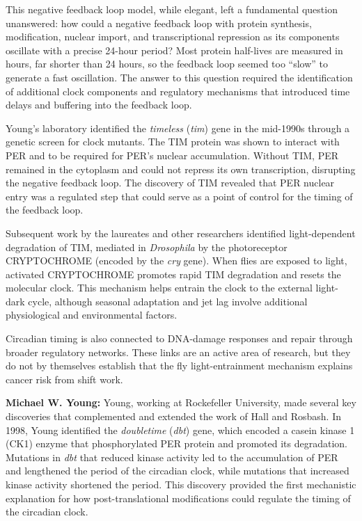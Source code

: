 This negative feedback loop model, while elegant, left a fundamental question unanswered: how could a negative feedback loop with protein synthesis, modification, nuclear import, and transcriptional repression as its components oscillate with a precise 24-hour period? Most protein half-lives are measured in hours, far shorter than 24 hours, so the feedback loop seemed too ``slow'' to generate a fast oscillation. The answer to this question required the identification of additional clock components and regulatory mechanisms that introduced time delays and buffering into the feedback loop.

Young's laboratory identified the \textit{timeless} (\textit{tim}) gene in the mid-1990s through a genetic screen for clock mutants. The TIM protein was shown to interact with PER and to be required for PER's nuclear accumulation. Without TIM, PER remained in the cytoplasm and could not repress its own transcription, disrupting the negative feedback loop. The discovery of TIM revealed that PER nuclear entry was a regulated step that could serve as a point of control for the timing of the feedback loop.

Subsequent work by the laureates and other researchers identified light-dependent degradation of TIM, mediated in \textit{Drosophila} by the photoreceptor CRYPTOCHROME (encoded by the \textit{cry} gene). When flies are exposed to light, activated CRYPTOCHROME promotes rapid TIM degradation and resets the molecular clock. This mechanism helps entrain the clock to the external light-dark cycle, although seasonal adaptation and jet lag involve additional physiological and environmental factors.

Circadian timing is also connected to DNA-damage responses and repair through broader regulatory networks. These links are an active area of research, but they do not by themselves establish that the fly light-entrainment mechanism explains cancer risk from shift work.

\textbf{Michael W. Young:} Young, working at Rockefeller University, made several key discoveries that complemented and extended the work of Hall and Rosbash. In 1998, Young identified the \textit{doubletime} (\textit{dbt}) gene, which encoded a casein kinase 1 (CK1) enzyme that phosphorylated PER protein and promoted its degradation. Mutations in \textit{dbt} that reduced kinase activity led to the accumulation of PER and lengthened the period of the circadian clock, while mutations that increased kinase activity shortened the period. This discovery provided the first mechanistic explanation for how post-translational modifications could regulate the timing of the circadian clock.

